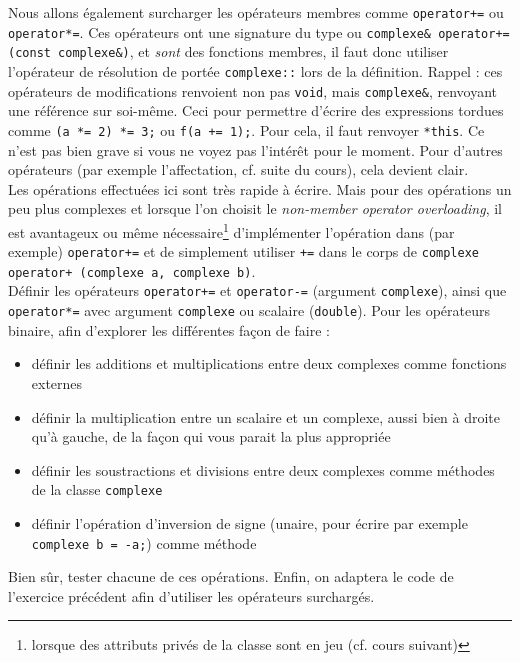\documentclass{book}
\newcommand{\inline}[1]{\texttt{#1}}
\begin{document}
Nous allons également surcharger les opérateurs membres comme \inline{operator+=} ou \inline{operator*=}. Ces opérateurs ont une signature du type ou \inline{complexe& operator+= (const complexe&)}, et \emph{sont} des fonctions membres, il faut donc utiliser l'opérateur de résolution de portée \inline{complexe::} lors de la définition. Rappel : ces opérateurs de modifications renvoient non pas \inline{void}, mais \inline{complexe&}, renvoyant une référence sur soi-même. Ceci pour permettre d'écrire des expressions tordues comme \inline{(a *= 2) *= 3;} ou \inline{f(a += 1);}. Pour cela, il faut renvoyer \inline{*this}. Ce n'est pas bien grave si vous ne voyez pas l'intérêt pour le moment. Pour d'autres opérateurs (par exemple l'affectation, cf. suite du cours), cela devient clair.\\

Les opérations effectuées ici sont très rapide à écrire. Mais pour des opérations un peu plus complexes et lorsque l'on choisit le \textit{non-member operator overloading}, il est avantageux ou même nécessaire\footnote{lorsque des attributs privés de la classe sont en jeu (cf. cours suivant)} d'implémenter l'opération dans (par exemple) \inline{operator+=} et de simplement utiliser \inline{+=} dans le corps de \inline{complexe operator+ (complexe a, complexe b)}.\\

Définir les opérateurs \inline{operator+=} et \inline{operator-=} (argument \inline{complexe}), ainsi que \inline{operator*=} avec argument \inline{complexe} ou scalaire (\inline{double}). Pour les opérateurs binaire, afin d'explorer les différentes façon de faire :
\begin{itemize}
  \item définir les additions et multiplications entre deux complexes comme fonctions externes
  \item définir la multiplication entre un scalaire et un complexe, aussi bien à droite qu'à gauche, de la façon qui vous parait la plus appropriée
  \item définir les soustractions et divisions entre deux complexes comme méthodes de la classe \inline{complexe}
  \item définir l'opération d'inversion de signe (unaire, pour écrire par exemple \inline{complexe b = -a;}) comme méthode
\end{itemize}

Bien sûr, tester chacune de ces opérations. Enfin, on adaptera le code de l'exercice précédent afin d'utiliser les opérateurs surchargés.
\end{document}
